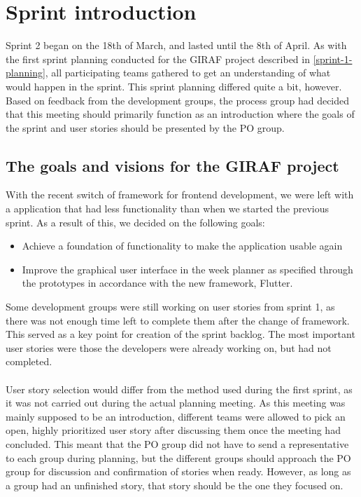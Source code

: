 \section{Sprint introduction}
Sprint 2 began on the 18th of March, and lasted until the 8th of April.
As with the first sprint planning conducted for the GIRAF project described in \autoref{sprint-1-planning}, all participating teams gathered to get an understanding of what would happen in the sprint.
This sprint planning differed quite a bit, however.
Based on feedback from the development groups, the process group had decided that this meeting should primarily function as an introduction where the goals of the sprint and user stories should be presented by the PO group.

\subsection{The goals and visions for the GIRAF project}
With the recent switch of framework for frontend development, we were left with a application that had less functionality than when we started the previous sprint.
As a result of this, we decided on the following goals:
\begin{itemize}
    \item Achieve a foundation of functionality to make the application usable again
    \item Improve the graphical user interface in the week planner as specified through the prototypes in accordance with the new framework, Flutter.
\end{itemize}
Some development groups were still working on user stories from sprint 1, as there was not enough time left to complete them after the change of framework.
This served as a key point for creation of the sprint backlog.
The most important user stories were those the developers were already working on, but had not completed. 
\\\\
User story selection would differ from the method used during the first sprint, as it was not carried out during the actual planning meeting.
As this meeting was mainly supposed to be an introduction, different teams were allowed to pick an open, highly prioritized user story after discussing them once the meeting had concluded.
This meant that the PO group did not have to send a representative to each group during planning, but the different groups should approach the PO group for discussion and confirmation of stories when ready.
However, as long as a group had an unfinished story, that story should be the one they focused on.

